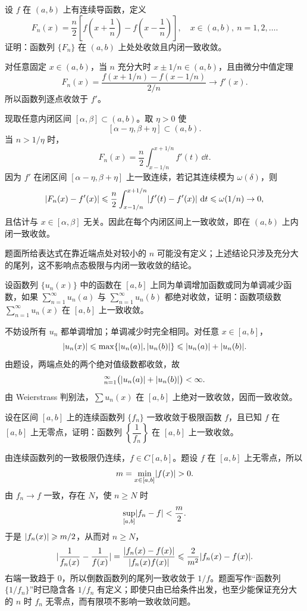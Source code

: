\begin{xexercise}[8]
设 $f$ 在 $(a,b)$ 上有连续导函数，定义
  \[
    F_n(x)=\frac n2\left[f\left(x+\frac1n\right)-f\left(x-\frac1n\right)\right],\quad x\in(a,b),\ n=1,2,\ldots.
  \]
  证明：函数列 $\{F_n\}$ 在 $(a,b)$ 上处处收敛且内闭一致收敛。
\end{xexercise}
\begin{xsolution}
对任意固定 $x\in(a,b)$，当 $n$ 充分大时 $x\pm1/n\in(a,b)$，且由微分中值定理
\[
  F_n(x)
  =\frac{f(x+1/n)-f(x-1/n)}{2/n}\to f'(x).
\]
所以函数列逐点收敛于 $f'$。

现取任意内闭区间 $[\alpha,\beta]\subset(a,b)$。取 $\eta>0$ 使
\[
  [\alpha-\eta,\beta+\eta]\subset(a,b).
\]
当 $n>1/\eta$ 时，
\[
  F_n(x)=\frac n2\int_{x-1/n}^{x+1/n}f'(t)\,\dd t.
\]
因为 $f'$ 在闭区间 $[\alpha-\eta,\beta+\eta]$ 上一致连续，若记其连续模为 $\omega(\delta)$，则
\[
  \lvert F_n(x)-f'(x)\rvert
  \leqslant\frac n2\int_{x-1/n}^{x+1/n}\lvert f'(t)-f'(x)\rvert\,\mathop{}\!\mathrm{d} t
  \leqslant\omega(1/n)\to0,
\]
且估计与 $x\in[\alpha,\beta]$ 无关。因此在每个内闭区间上一致收敛，即在 $(a,b)$ 上内闭一致收敛。

题面所给表达式在靠近端点处对较小的 $n$ 可能没有定义；上述结论只涉及充分大的尾列，这不影响点态极限与内闭一致收敛的结论。
\end{xsolution}


\begin{xexercise}[9]
设函数列 $\{u_n(x)\}$ 中的函数在 $[a,b]$ 上同为单调增加函数或同为单调减少函数，如果 $\displaystyle\sum_{n=1}^{\infty}u_n(a)$ 与 $\displaystyle\sum_{n=1}^{\infty}u_n(b)$ 都绝对收敛，证明：函数项级数 $\displaystyle\sum_{n=1}^{\infty}u_n(x)$ 在 $[a,b]$ 上一致收敛。
\end{xexercise}
\begin{xsolution}
不妨设所有 $u_n$ 都单调增加；单调减少时完全相同。对任意 $x\in[a,b]$，
\[
  \lvert u_n(x)\rvert\leqslant\max\{\lvert u_n(a)\rvert,\lvert u_n(b)\rvert\}
  \leqslant\lvert u_n(a)\rvert+\lvert u_n(b)\rvert.
\]
由题设，两端点处的两个绝对值级数都收敛，故
\[
  \relax_{n=1}^{\infty}\bigl(\lvert u_n(a)\rvert+\lvert u_n(b)\rvert\bigr)<\infty.
\]
由 Weierstrass 判别法，$\sum u_n(x)$ 在 $[a,b]$ 上绝对一致收敛，因而一致收敛。
\end{xsolution}


\begin{xexercise}[10]
设在区间 $[a,b]$ 上的连续函数列 $\{f_n\}$ 一致收敛于极限函数 $f$，且已知 $f$ 在 $[a,b]$ 上无零点，证明：函数列 $\left\{\dfrac1{f_n}\right\}$ 在 $[a,b]$ 上一致收敛。
\end{xexercise}
\begin{xsolution}
由连续函数列的一致极限仍连续，$f\in C[a,b]$。题设 $f$ 在 $[a,b]$ 上无零点，所以
\[
  m=\min_{x\in[a,b]}\lvert f(x)\rvert>0.
\]
由 $f_n\to f$ 一致，存在 $N$，使 $n\geqslant N$ 时
\[
  \sup_{[a,b]}\lvert f_n-f\rvert<\frac m2.
\]
于是 $\lvert f_n(x)\rvert\geqslant m/2$，从而对 $n\geqslant N$，
\[
  \lvert\frac1{f_n(x)}-\frac1{f(x)}\rvert
  =\frac{\lvert f_n(x)-f(x)\rvert}{\lvert f_n(x)f(x)\rvert}
  \leqslant\frac2{m^2}\lvert f_n(x)-f(x)\rvert.
\]
右端一致趋于 $0$，所以倒数函数列的尾列一致收敛于 $1/f$。题面写作“函数列 $\{1/f_n\}$”时已隐含各 $1/f_n$ 有定义；即使只由已给条件出发，也至少能保证充分大的 $n$ 时 $f_n$ 无零点，而有限项不影响一致收敛问题。
\end{xsolution}


